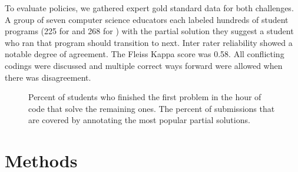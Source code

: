To evaluate policies, we gathered expert gold standard data for both challenges. A group of seven computer science educators each labeled hundreds of student programs (225 for \Pa  and 268 for \Pb\hspace{-0.5mm}) with the partial solution they suggest a student who ran that program should transition to next. Inter rater reliability showed a notable degree of agreement. The Fleiss Kappa score \cite{fleiss1981measurement} was 0.58. All conflicting codings were discussed and multiple correct ways forward were allowed when there was disagreement.

\begin{figure}
\centering
{}

\caption[Overview of Code.org data]{
 Percent of students who finished the first problem in the hour of code that solve the remaining ones.
  The percent of submissions that are covered by annotating the most popular partial solutions. 
 }
\label{tab:predacc}
\end{figure}

\section{Methods}

